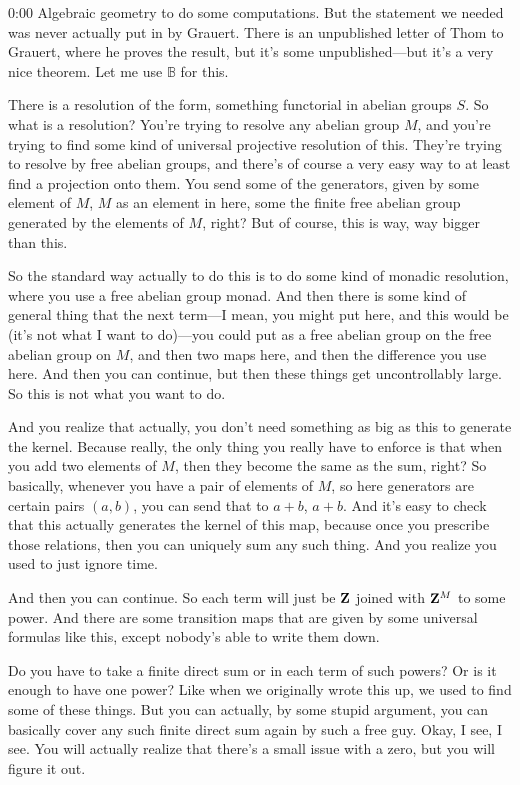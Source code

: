 \begin{unfinished}{0:00}
Algebraic geometry to do some computations. But the statement we needed was never actually put in by Grauert. There is an unpublished letter of Thom to Grauert, where he proves the result, but it's some unpublished---but it's a very nice theorem. Let me use $\mathbb{B}$ for this.

There is a resolution of the form, something functorial in abelian groups $S$. So what is a resolution? You're trying to resolve any abelian group $M$, and you're trying to find some kind of universal projective resolution of this. They're trying to resolve by free abelian groups, and there's of course a very easy way to at least find a projection onto them. You send some of the generators, given by some element of $M$, $M$ as an element in here, some the finite free abelian group generated by the elements of $M$, right? But of course, this is way, way bigger than this.

So the standard way actually to do this is to do some kind of monadic resolution, where you use a free abelian group monad. And then there is some kind of general thing that the next term---I mean, you might put here, and this would be (it's not what I want to do)---you could put as a free abelian group on the free abelian group on $M$, and then two maps here, and then the difference you use here. And then you can continue, but then these things get uncontrollably large. So this is not what you want to do.

And you realize that actually, you don't need something as big as this to generate the kernel. Because really, the only thing you really have to enforce is that when you add two elements of $M$, then they become the same as the sum, right? So basically, whenever you have a pair of elements of $M$, so here generators are certain pairs $(a,b)$, you can send that to $a+b$, $a+b$. And it's easy to check that this actually generates the kernel of this map, because once you prescribe those relations, then you can uniquely sum any such thing. And you realize you used to just ignore time.

And then you can continue. So each term will just be $\mathbf Z$ joined with $\mathbf Z^M$ to some power. And there are some transition maps that are given by some universal formulas like this, except nobody's able to write them down.

Do you have to take a finite direct sum or in each term of such powers? Or is it enough to have one power? Like when we originally wrote this up, we used to find some of these things. But you can actually, by some stupid argument, you can basically cover any such finite direct sum again by such a free guy. Okay, I see, I see. You will actually realize that there's a small issue with a zero, but you will figure it out.


\end{unfinished}
